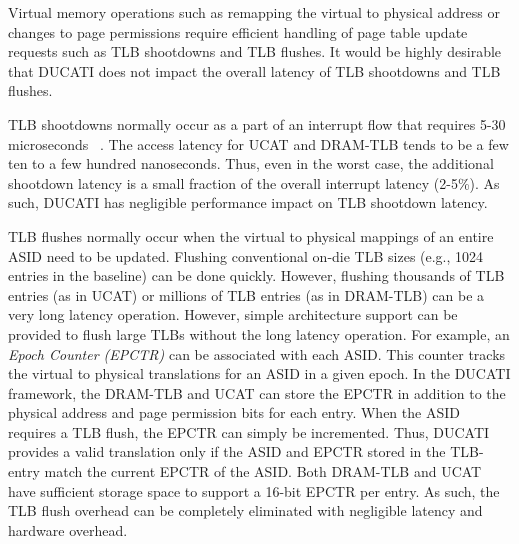 % 

\noindent Virtual memory operations such as remapping the virtual to
physical address or changes to page permissions require efficient
handling of page table update requests such as TLB shootdowns and TLB
flushes. It would be highly desirable that DUCATI does not impact the
overall latency of TLB shootdowns and TLB flushes.

TLB shootdowns normally occur as a part of an interrupt flow that
requires 5-30 microseconds ~\cite{zhengpagedgpu}. The access latency
for UCAT and DRAM-TLB tends to be a few ten to a few hundred
nanoseconds. Thus, even in the worst case, the additional shootdown
latency is a small fraction of the overall interrupt latency (2-5\%).
As such, DUCATI has negligible performance impact on TLB shootdown
latency.

TLB flushes normally occur when the virtual to physical mappings of an
entire ASID need to be updated. Flushing conventional on-die TLB sizes
(e.g., 1024 entries in the baseline) can be done quickly. However,
flushing thousands of TLB entries (as in UCAT) or millions of TLB
entries (as in DRAM-TLB) can be a very long latency operation.
However, simple architecture support can be provided to flush large
TLBs without the long latency operation. For example, an {\em Epoch
Counter (EPCTR)} can be associated with each ASID. This counter tracks
the virtual to physical translations for an ASID in a given epoch. In
the DUCATI framework, the DRAM-TLB and UCAT can store the EPCTR in
addition to the physical address and page permission bits for each
entry. When the ASID requires a TLB flush, the EPCTR can simply be
incremented. Thus, DUCATI provides a valid translation only if the
ASID and EPCTR stored in the TLB-entry match the current EPCTR of the
ASID. Both DRAM-TLB and UCAT have sufficient storage space to support
a 16-bit EPCTR per entry. As such, the TLB flush overhead can be
completely eliminated with negligible latency and hardware overhead.


% 


